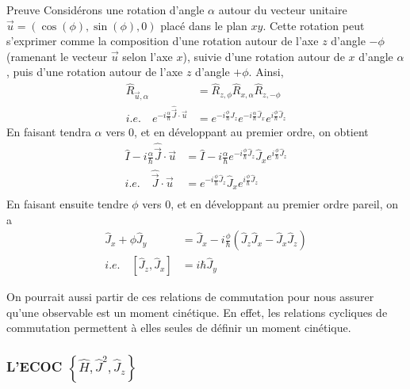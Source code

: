 \begin{demo}{Preuve}
    Considérons une rotation d’angle $\alpha$ autour du vecteur unitaire $\vec{u} = (\cos(\phi), \sin(\phi), 0)$ placé dans le plan $xy$. Cette rotation peut s’exprimer comme la composition d’une rotation autour de l’axe $z$ d’angle $-\phi$ (ramenant le vecteur $\vec{u}$ selon l’axe $x$), suivie d’une rotation autour de $x$ d’angle $\alpha$, puis d’une rotation autour de l’axe $z$ d’angle $+\phi$. Ainsi,
    \begin{align*}
        \hat{R}_{\vec{u}, \alpha}                                                    & = \hat{R}_{z, \phi} \hat{R}_{x,\alpha} \hat{R}_{z, -\phi}                                                      \\
        \textit{i.e.} \quad e^{- i \frac{\alpha}{\hbar} \hat{\vec{J}} \cdot \vec{u}} & = e^{- i \frac{\phi}{\hbar} \hat{J}_z}e^{- i \frac{\alpha}{\hbar} \hat{J}_x}e^{i \frac{\phi}{\hbar} \hat{J}_z}
    \end{align*}
    En faisant tendra $\alpha$ vers $0$, et en développant au premier ordre, on obtient
    \begin{align*}
        \hat{I} - i \frac{\alpha}{\hbar} \hat{\vec{J}} \cdot \vec{u} & = \hat{I} - i \frac{\alpha}{\hbar} e^{- i \frac{\phi}{\hbar} \hat{J}_z} \hat{J}_x e^{i \frac{\phi}{\hbar} \hat{J}_z} \\
        \textit{i.e.} \quad \hat{\vec{J}} \cdot \vec{u}              & =  e^{- i \frac{\phi}{\hbar} \hat{J}_z} \hat{J}_x e^{i \frac{\phi}{\hbar} \hat{J}_z}                                 \\
    \end{align*}
    \[  \]
    En faisant ensuite tendre $\phi$ vers $0$, et en développant au premier ordre pareil, on a
    \begin{align*}
        \hat{J}_x + \phi \hat{J}_y                            & = \hat{J}_x - i \frac{\phi}{\hbar} (\hat{J}_z \hat{J}_x - \hat{J}_x \hat{J}_z) \\
        \textit{i.e.} \quad \left[\hat{J}_z, \hat{J}_x\right] & = i\hbar \hat{J}_y
    \end{align*}
\end{demo}

        On pourrait aussi partir de ces relations de commutation pour nous assurer qu’une observable est un moment cinétique. En effet, les relations cycliques de commutation permettent à elles seules de définir un moment cinétique.

        \subsubsection{L’ECOC $\left\{\hat{H}, \hat{J}^2, \hat{J}_z\right\}$}

